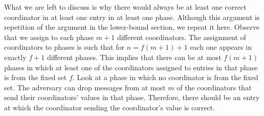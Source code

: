\documentclass[11pt]{article}
\begin{document}
What we are left  to discuss is why there would always be at least one correct coordinator in at least one entry in at least one phase. 
Although this argument is repetition of the argument in the lower-bound section, we repeat it here.  Observe that we assign to each phase   $m+1$ different coordinators.
The assignment of  coordinators to phases is such that for $n=f(m+1)+1$ each one appears in exactly $f+1$ different phases.  This implies that there can be at most $f(m+1)$ phases in which at least one of the coordinators assigned to entries in that phase is from the fixed set $f$.  Look at a phase in which no coordinator is from the fixed set.  The adversary can drop messages from at most $m$ of the coordinators that send their coordinators' values in that phase.  Therefore, there should be an entry at which the coordinator sending the coordinator's value is correct.
\end{document}
